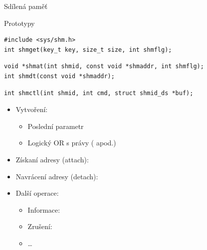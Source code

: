 \begin{frame}[fragile]{Sdílená paměť}

  \begin{block}{Prototypy}
    \begin{lstlisting}[aboveskip=2pt,belowskip=0pt]
#include <sys/shm.h>
int shmget(key_t key, size_t size, int shmflg);
    \end{lstlisting}
    \begin{lstlisting}[aboveskip=0pt,belowskip=0pt]
void *shmat(int shmid, const void *shmaddr, int shmflg);
int shmdt(const void *shmaddr);
    \end{lstlisting}
    \begin{lstlisting}[aboveskip=0pt,belowskip=2pt]
int shmctl(int shmid, int cmd, struct shmid_ds *buf);
    \end{lstlisting}
  \end{block}


  \begin{itemize}
    \item Vytvoření: 
    \begin{itemize}
      \item Poslední parametr 
      \item Logický OR s právy ( apod.)
    \end{itemize}

    \pause

    \item Získaní adresy (attach): 
    \item Navrácení adresy (detach): 

    \pause

    \item Další operace: 
    \begin{itemize}
      \item Informace: 
      \item Zrušení: 
      \item \dots
    \end{itemize}
  \end{itemize}

\end{frame}

